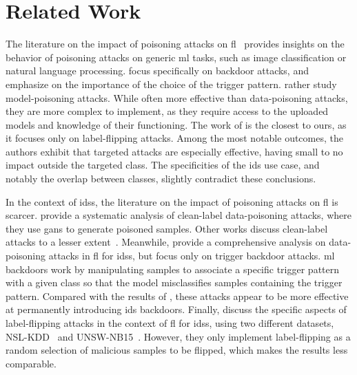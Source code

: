 \section{Related Work\label{sec:assess.related}}

The literature on the impact of poisoning attacks on \gls{fl}~\cite{bhagoji_AnalyzingFederatedLearning_2019,tolpegin_DataPoisoningAttacks_2020,nuding_DataPoisoningSequential_2022,sun_DataPoisoningAttacks_2022} provides insights on the behavior of poisoning attacks on generic \gls{ml} tasks, such as image classification or natural language processing.
\Textcite{nuding_DataPoisoningSequential_2022} focus specifically on backdoor attacks, and emphasize on the importance of the choice of the trigger pattern. 
\Textcite{sun_DataPoisoningAttacks_2022,fang_LocalModelPoisoning_2020} rather study model-poisoning attacks. %
While often more effective than data-poisoning attacks, they are more complex to implement, as they require access to the uploaded models and knowledge of their functioning.
The work of \textcite{tolpegin_DataPoisoningAttacks_2020} is the closest to ours, as it focuses only on label-flipping attacks.
Among the most notable outcomes, the authors exhibit that targeted attacks are especially effective, having small to no impact outside the targeted class.
The specificities of the \gls{ids} use case, and notably the overlap between classes, slightly contradict these conclusions.

In the context of \glspl{ids}, the literature on the impact of poisoning attacks on \gls{fl} is scarcer.
\Textcite{zhang_Evaluationdatapoisoning_2022} provide a systematic analysis of clean-label data-poisoning attacks, where they use \glspl{gan} to generate poisoned samples. 
Other works discuss clean-label attacks to a lesser extent~\cite{nguyen_PoisoningAttacksFederated_2020b,vy_FederatedLearningBasedIntrusion_2021}.
Meanwhile, \textcite{merzouk_Parameterizingpoisoningattacks_2023} provide a comprehensive analysis on data-poisoning attacks in \gls{fl} for \glspl{ids}, but focus only on trigger backdoor attacks.
\Gls{ml} backdoors work by manipulating samples to associate a specific trigger pattern with a given class so that the model misclassifies samples containing the trigger pattern.
Compared with the results of , these attacks appear to be more effective at permanently introducing \gls{ids} backdoors.
Finally, \textcite{yang_Dependablefederatedlearning_2023} discuss the specific aspects of label-flipping attacks in the context of \gls{fl} for \glspl{ids}, using two different datasets, NSL-KDD~\cite{tavallaee_detailedanalysisKDD_2009} and UNSW-NB15~\cite{moustafa_UNSWNB15comprehensivedata_2015}.
However, they only implement label-flipping as a random selection of malicious samples to be flipped, which makes the results less comparable.
